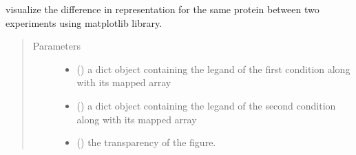 \documentclass[letterpaper,10pt,english]{sphinxmanual}
\begin{document}
\begin{fulllineitems}
\label{\detokenize{IPTK.Visualization:IPTK.Visualization.vizTools.plot_paired_represention}}
visualize the difference in representation for the same protein between two experiments using matplotlib library.
\begin{quote}\begin{description}
\item[{Parameters}] \leavevmode\begin{itemize}
\item {} 
 (\sphinxstyleliteralemphasis{\sphinxupquote{{[}}}\sphinxstyleliteralemphasis{\sphinxupquote{, }}\sphinxstyleliteralemphasis{\sphinxupquote{{]}}}) \textendash{} a dict object containing the legand of the first condition along with its mapped array

\item {} 
 (\sphinxstyleliteralemphasis{\sphinxupquote{{[}}}\sphinxstyleliteralemphasis{\sphinxupquote{, }}\sphinxstyleliteralemphasis{\sphinxupquote{{]}}}) \textendash{} a dict object containing the legand of the second condition along with its mapped array

\item {} 
 () \textendash{} the transparency of the figure.


\end{itemize}
\end{description}
\end{quote}
\end{fulllineitems}
\end{document}
